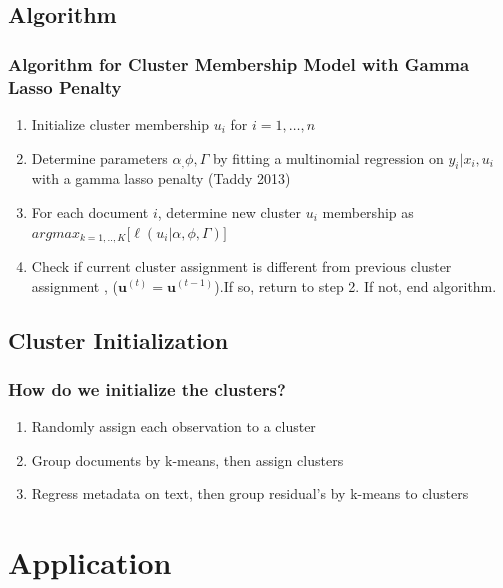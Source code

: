 \documentclass{beamer}
\begin{document}
\subsection{Algorithm}
\begin{frame}
\frametitle{Algorithm for Cluster Membership Model with Gamma Lasso Penalty}
\begin{enumerate}
\def\labelenumi{\arabic{enumi}.}
\item<+->
 Initialize cluster membership $u_i$ for $i = 1, \dots, n$
\item<+->
  Determine parameters $\alpha_, \phi, \Gamma$ by fitting a multinomial
  regression on $y_i | x_i , u_i$ with a gamma lasso penalty (Taddy 2013)
\item<+->
 For each document $i$, determine new cluster $u_i$ membership as \\
  $argmax_{k = 1,..,K} \big[  \ell(u_i| \alpha, \phi, \Gamma) \big]$
\item<+->
 Check if current cluster assignment is different from previous cluster assignment , ($\textbf{u}^{(t)}  = \textbf{u}^{(t-1)}$).If so, return to step 2. If not, end algorithm.
\end{enumerate}
\end{frame}

\subsection{Cluster Initialization}
\begin{frame}
\frametitle{How do we initialize the clusters?}
\begin{enumerate}
\item<2-> Randomly assign each observation to a cluster 
\item<3-> Group documents by k-means, then assign clusters 
\item<4-> Regress metadata on text, then group residual's by k-means to clusters
\end{enumerate}
\end{frame}


\section{Application}
\end{document}
